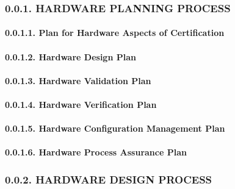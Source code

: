 \documentclass[
]{article}
\begin{document}
\hypertarget{hardware-planning-process}{%
\subsubsection{0.0.1. HARDWARE PLANNING
PROCESS}\label{hardware-planning-process}}

\hypertarget{plan-for-hardware-aspects-of-certification}{%
\paragraph{0.0.1.1. Plan for Hardware Aspects of
Certification}\label{plan-for-hardware-aspects-of-certification}}

\hypertarget{hardware-design-plan}{%
\paragraph{0.0.1.2. Hardware Design Plan}\label{hardware-design-plan}}

\hypertarget{hardware-validation-plan}{%
\paragraph{0.0.1.3. Hardware Validation
Plan}\label{hardware-validation-plan}}

\hypertarget{hardware-verification-plan}{%
\paragraph{0.0.1.4. Hardware Verification
Plan}\label{hardware-verification-plan}}

\hypertarget{hardware-configuration-management-plan}{%
\paragraph{0.0.1.5. Hardware Configuration Management
Plan}\label{hardware-configuration-management-plan}}

\hypertarget{hardware-process-assurance-plan}{%
\paragraph{0.0.1.6. Hardware Process Assurance
Plan}\label{hardware-process-assurance-plan}}

\hypertarget{hardware-design-process}{%
\subsubsection{0.0.2. HARDWARE DESIGN
PROCESS}\label{hardware-design-process}}
\end{document}
